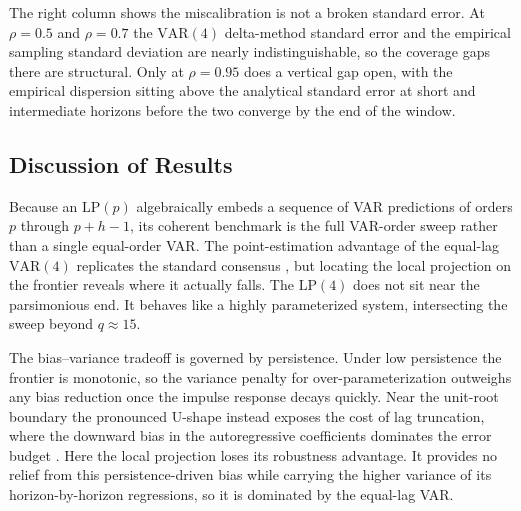 The right column shows the miscalibration is not a broken standard error. At $\rho=0.5$ and
$\rho=0.7$ the $\text{VAR}(4)$ delta-method standard error and the empirical sampling standard
deviation are nearly indistinguishable, so the coverage gaps there are structural. Only at
$\rho=0.95$ does a vertical gap open, with the empirical dispersion sitting above the analytical
standard error at short and intermediate horizons before the two converge by the end of the
window.

\FloatBarrier

\subsection{Discussion of Results}

Because an $\text{LP}(p)$ algebraically embeds a sequence of VAR predictions of orders $p$ 
through $p+h-1$, its coherent benchmark is the full VAR-order sweep rather than a single 
equal-order VAR. The point-estimation advantage of the equal-lag $\text{VAR}(4)$ replicates the 
standard consensus \parencite{li2024local, olea2025local}, but locating the local projection on 
the frontier reveals where it actually falls. The $\text{LP}(4)$ does not sit near the 
parsimonious end. It behaves like a highly parameterized system, intersecting the sweep beyond 
$q \approx 15$.

The bias--variance tradeoff is governed by persistence. Under low persistence the frontier is 
monotonic, so the variance penalty for over-parameterization outweighs any bias reduction once 
the impulse response decays quickly. Near the unit-root boundary the pronounced U-shape instead 
exposes the cost of lag truncation, where the downward bias in the autoregressive coefficients 
dominates the error budget \parencite{kilian1998small}. Here the local projection loses its 
robustness advantage. It provides no relief from this persistence-driven bias while carrying the 
higher variance of its horizon-by-horizon regressions, so it is dominated by the equal-lag VAR.


